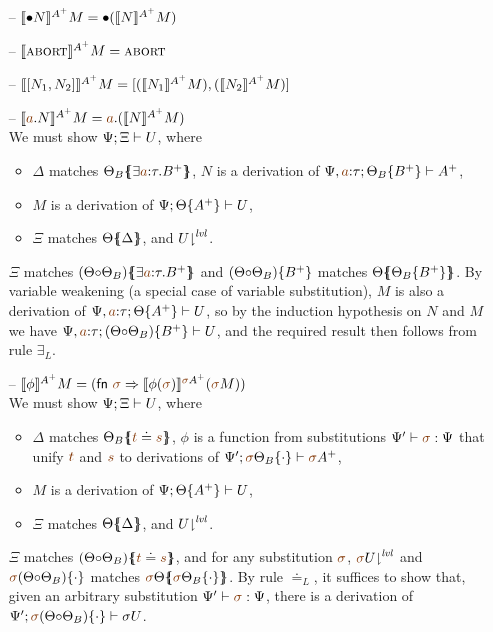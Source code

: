 \begin{itemize}
\item[--] $\lsubsta{\tfusel{N}}{M}{A^+} = \tfusel{(\lsubsta{N}{M}{A^+})}$
\item[--] $\lsubsta{\tabort}{M}{A^+} = \tabort$
\item[--] $\lsubsta{\toplusl{N_1}{N_2}}{M}{A^+} = \toplusl{(\lsubsta{N_1}{M}{A^+})}{(\lsubsta{N_2}{M}{A^+})}$
\item[--] $\lsubsta{\texistsl{\lf{a}}{N}}{M}{A^+} = \texistsl{\lf{a}}{(\lsubsta{N}{M}{A^+})}$\smallskip\\
  We must show $\foc{\Psi}{\Xi}{U}$, where
  \begin{itemize}
  \item $\Delta$ matches $\frameoff{\Theta_B}{\exists \lf{a}{:}\tau.B^+}$, 
     $N$ is a derivation of $\foc{\Psi,\lf{a}{:}\tau}{\tackon{\Theta_B}{B^+}}{A^+}$,
  \item $M$ is a derivation of $\foc{\Psi}{\tackon{\Theta}{A^+}}{U}$,
  \item $\Xi$ matches $\frameoff{\Theta}{\Delta}$, and
     $\restrictfrom{U}{\mlvl}$.
  \end{itemize}
  $\Xi$ matches $\frameoff{(\Theta{\circ}\Theta_B)}{\exists \lf{a}{:}\tau.B^+}$
  and $\tackon{(\Theta{\circ}\Theta_B)}{B^+}$ matches 
  $\frameoff{\Theta}{\tackon{\Theta_B}{B^+}}$. By variable weakening (a special case of variable substitution),
  $M$ is also a derivation of $\foc{\Psi, \lf{a}{:}\tau}{\tackon{\Theta}{A^+}}{U}$,
  so by the induction hypothesis on $N$ and $M$ we have
  $\foc{\Psi, \lf{a}{:}\tau}{\tackon{(\Theta{\circ}\Theta_B)}{B^+}}{U}$, 
  and the required result then follows from rule $\exists_L$. \smallskip

\item[--] $\lsubsta{\phi}{M}{{A^+}} 
           = (\mathsf{fn}~\lf\sigma \Rightarrow \lsubsta{\phi(\lf\sigma)}{(\lf\sigma{M})}{\lf\sigma A^+})$\smallskip\\
  We must show $\foc{\Psi}{\Xi}{U}$, where
  \begin{itemize}
  \item $\Delta$ matches $\frameoff{\Theta_B}{\lf t \doteq \lf s}$,
    $\phi$ is a function from substitutions $\Psi' \vdash \lf \sigma : \Psi$
    that unify $\lf t$ and $\lf s$ to derivations of 
    $\foc{\Psi'}{\tackon{\lf \sigma{\Theta_B}}{\cdot}}{\lf \sigma{A^+}}$,
  \item $M$ is a derivation of $\foc{\Psi}{\tackon{\Theta}{A^+}}{U}$,
  \item $\Xi$ matches $\frameoff{\Theta}{\Delta}$, and 
     $\restrictfrom{U}{\mlvl}$.
  \end{itemize}
  $\Xi$ matches $\frameoff{(\Theta{\circ}\Theta_B)}{\lf t \doteq \lf s}$, and 
  for any substitution $\lf \sigma$, 
  $\restrictfrom{\lf \sigma{U}}{\mlvl}$ and
  $\tackon{\lf \sigma(\Theta{\circ}\Theta_B)}{\cdot}$ matches 
  $\frameoff{\lf \sigma\Theta}{\tackon{\lf\sigma\Theta_B}{\cdot}}$.
  By rule $\doteq_L$, it suffices to show that, 
  given an arbitrary substitution $\Psi' \vdash \lf\sigma : \Psi$, 
  there is a derivation of 
  $\foc{\Psi'}{\tackon{\lf \sigma(\Theta{\circ}\Theta_B)}{\cdot}}{\sigma{U}}$.
  


\end{itemize}
